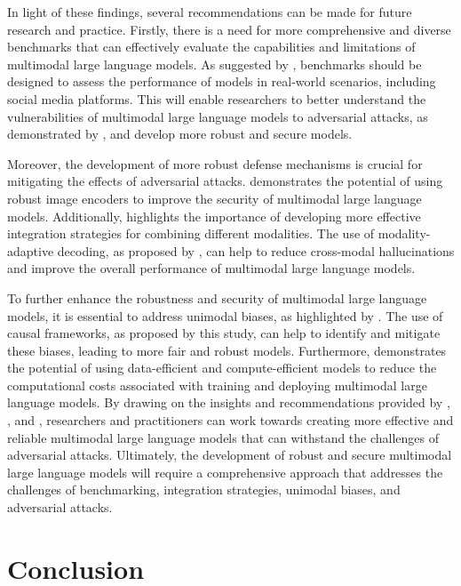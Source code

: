 \documentclass[11pt,a4paper]{article}
\begin{document}
In light of these findings, several recommendations can be made for future research and practice. Firstly, there is a need for more comprehensive and diverse benchmarks that can effectively evaluate the capabilities and limitations of multimodal large language models. As suggested by \cite{arxiv:2402.14154}, benchmarks should be designed to assess the performance of models in real-world scenarios, including social media platforms. This will enable researchers to better understand the vulnerabilities of multimodal large language models to adversarial attacks, as demonstrated by \cite{arxiv:2403.13507}, and develop more robust and secure models.

Moreover, the development of more robust defense mechanisms is crucial for mitigating the effects of adversarial attacks. \cite{arxiv:2502.01576} demonstrates the potential of using robust image encoders to improve the security of multimodal large language models. Additionally, \cite{arxiv:2506.04788} highlights the importance of developing more effective integration strategies for combining different modalities. The use of modality-adaptive decoding, as proposed by \cite{arxiv:2601.21181}, can help to reduce cross-modal hallucinations and improve the overall performance of multimodal large language models.

To further enhance the robustness and security of multimodal large language models, it is essential to address unimodal biases, as highlighted by \cite{arxiv:2403.18346}. The use of causal frameworks, as proposed by this study, can help to identify and mitigate these biases, leading to more fair and robust models. Furthermore, \cite{arxiv:2408.11795} demonstrates the potential of using data-efficient and compute-efficient models to reduce the computational costs associated with training and deploying multimodal large language models. By drawing on the insights and recommendations provided by \cite{arxiv:2408.15769}, \cite{arxiv:2307.06281}, and \cite{arxiv:2408.15998}, researchers and practitioners can work towards creating more effective and reliable multimodal large language models that can withstand the challenges of adversarial attacks. Ultimately, the development of robust and secure multimodal large language models will require a comprehensive approach that addresses the challenges of benchmarking, integration strategies, unimodal biases, and adversarial attacks.


\section{Conclusion}
\end{document}
